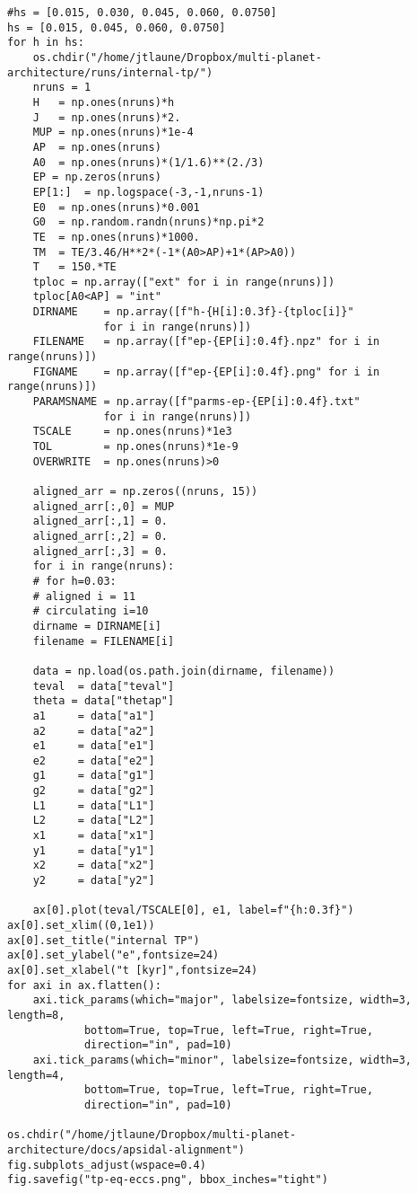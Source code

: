 \documentclass[11pt]{article}
\begin{document}
\begin{verbatim}
#hs = [0.015, 0.030, 0.045, 0.060, 0.0750]
hs = [0.015, 0.045, 0.060, 0.0750]
for h in hs:
    os.chdir("/home/jtlaune/Dropbox/multi-planet-architecture/runs/internal-tp/")
    nruns = 1
    H   = np.ones(nruns)*h
    J   = np.ones(nruns)*2.
    MUP = np.ones(nruns)*1e-4
    AP  = np.ones(nruns)
    A0  = np.ones(nruns)*(1/1.6)**(2./3)
    EP = np.zeros(nruns)
    EP[1:]  = np.logspace(-3,-1,nruns-1)
    E0  = np.ones(nruns)*0.001
    G0  = np.random.randn(nruns)*np.pi*2
    TE  = np.ones(nruns)*1000.
    TM  = TE/3.46/H**2*(-1*(A0>AP)+1*(AP>A0))
    T   = 150.*TE
    tploc = np.array(["ext" for i in range(nruns)])
    tploc[A0<AP] = "int"
    DIRNAME    = np.array([f"h-{H[i]:0.3f}-{tploc[i]}"
			   for i in range(nruns)])
    FILENAME   = np.array([f"ep-{EP[i]:0.4f}.npz" for i in range(nruns)])
    FIGNAME    = np.array([f"ep-{EP[i]:0.4f}.png" for i in range(nruns)])
    PARAMSNAME = np.array([f"parms-ep-{EP[i]:0.4f}.txt"
			   for i in range(nruns)])
    TSCALE     = np.ones(nruns)*1e3
    TOL        = np.ones(nruns)*1e-9
    OVERWRITE  = np.ones(nruns)>0

    aligned_arr = np.zeros((nruns, 15))
    aligned_arr[:,0] = MUP
    aligned_arr[:,1] = 0.
    aligned_arr[:,2] = 0.
    aligned_arr[:,3] = 0.
    for i in range(nruns):
	# for h=0.03:
	# aligned i = 11
	# circulating i=10
	dirname = DIRNAME[i]
	filename = FILENAME[i]

	data = np.load(os.path.join(dirname, filename))
	teval  = data["teval"]
	theta = data["thetap"]
	a1     = data["a1"]
	a2     = data["a2"]
	e1     = data["e1"]
	e2     = data["e2"]
	g1     = data["g1"]
	g2     = data["g2"]
	L1     = data["L1"]
	L2     = data["L2"]
	x1     = data["x1"]
	y1     = data["y1"]
	x2     = data["x2"]
	y2     = data["y2"]

	ax[0].plot(teval/TSCALE[0], e1, label=f"{h:0.3f}")
ax[0].set_xlim((0,1e1))
ax[0].set_title("internal TP")
ax[0].set_ylabel("e",fontsize=24)
ax[0].set_xlabel("t [kyr]",fontsize=24)
for axi in ax.flatten():
    axi.tick_params(which="major", labelsize=fontsize, width=3, length=8,
		    bottom=True, top=True, left=True, right=True,
		    direction="in", pad=10)
    axi.tick_params(which="minor", labelsize=fontsize, width=3, length=4,
		    bottom=True, top=True, left=True, right=True,
		    direction="in", pad=10)

os.chdir("/home/jtlaune/Dropbox/multi-planet-architecture/docs/apsidal-alignment")
fig.subplots_adjust(wspace=0.4)
fig.savefig("tp-eq-eccs.png", bbox_inches="tight")

\end{verbatim}
\end{document}
